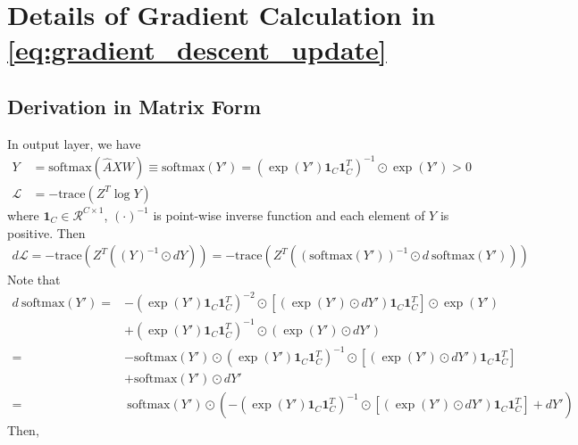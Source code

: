 \documentclass{article}
\newcommand{\trace}{\mathrm{trace}}
\newcommand{\0}{{\boldsymbol{0}}}
\newcommand{\6}{{\partial}}
\newcommand{\8}{{\infty}}
\newcommand{\4}{{\nabla}}
\begin{document}
\fi
\section{Details of Gradient Calculation in \eqref{eq:gradient_descent_update}}
\label{appendix:details_of_nll_loss_explanation}
\subsection{Derivation in Matrix Form}
In output layer, we have
\begin{align*}
Y & = \text{softmax} (\hat{A} X W ) \equiv  \text{softmax} (Y') = \left(\exp(Y') \bm{1}_C \bm{1}_C^T \right)^{-1}  \odot \exp(Y') > 0 \\   
\mathcal{L} & = -\trace(Z^T \log Y)    
\end{align*}
where $\bm{1}_C \in \mathcal{R}^{C\times 1}$, $(\cdot)^{-1}$ is point-wise inverse function and each element of $Y$ is positive. Then
\begin{align*}
d \mathcal{L} = -\trace\left(Z^T ((Y)^{-1} \odot d Y) \right) = -\trace\left(Z^T \left( \left(\text{softmax} (Y') \right)^{-1} \odot d\ \text{softmax} ( Y') \right) \right) 
\end{align*}
Note that
\begin{equation}
\begin{aligned}
d\ \text{softmax} (Y') 
= & - \left(\exp(Y') \bm{1}_C \bm{1}_C^T \right)^{-2} \odot [(\exp(Y') \odot d Y') \bm{1}_C \bm{1}_C^T] \odot \exp(Y')  \\ \nonumber
& + \left(\exp(Y') \bm{1}_C \bm{1}_C^T \right)^{-1}  \odot (\exp(Y') \odot d Y')\\ \nonumber
 = & - \text{softmax} (Y') \odot \left(\exp(Y') \bm{1}_C \bm{1}_C^T \right)^{-1} \odot [(\exp(Y') \odot d Y') \bm{1}_C \bm{1}_C^T]   \\
& + \text{softmax} (Y') \odot d Y'\\ \nonumber
 =  & \ \text{softmax} (Y') \odot \left(  - \left(\exp(Y') \bm{1}_C \bm{1}_C^T \right)^{-1} \odot \left[(\exp(Y') \odot d Y') \bm{1}_C \bm{1}_C^T \right] + d Y' \right) \nonumber
\end{aligned}
\end{equation}
Then,
\end{document}
